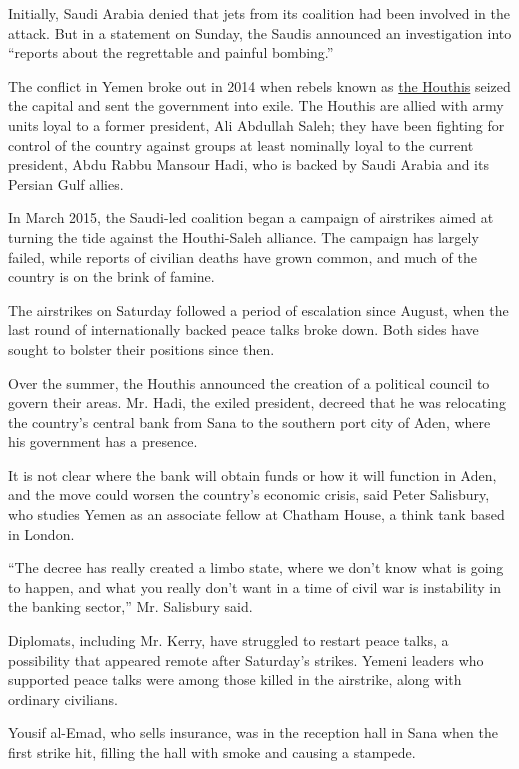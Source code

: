 Initially, Saudi Arabia denied that jets from its coalition had been
involved in the attack. But in a statement on Sunday, the Saudis
announced an investigation into ``reports about the regrettable and
painful bombing.''

The conflict in Yemen broke out in 2014 when rebels known as
\href{http://www.nytimes3xbfgragh.onion/2015/01/21/world/middleeast/who-are-the-houthis-of-yemen.html}{the
Houthis} seized the capital and sent the government into exile. The
Houthis are allied with army units loyal to a former president, Ali
Abdullah Saleh; they have been fighting for control of the country
against groups at least nominally loyal to the current president, Abdu
Rabbu Mansour Hadi, who is backed by Saudi Arabia and its Persian Gulf
allies.

In March 2015, the Saudi-led coalition began a campaign of airstrikes
aimed at turning the tide against the Houthi-Saleh alliance. The
campaign has largely failed, while reports of civilian deaths have grown
common, and much of the country is on the brink of famine.

The airstrikes on Saturday followed a period of escalation since August,
when the last round of internationally backed peace talks broke down.
Both sides have sought to bolster their positions since then.

Over the summer, the Houthis announced the creation of a political
council to govern their areas. Mr. Hadi, the exiled president, decreed
that he was relocating the country's central bank from Sana to the
southern port city of Aden, where his government has a presence.

It is not clear where the bank will obtain funds or how it will function
in Aden, and the move could worsen the country's economic crisis, said
Peter Salisbury, who studies Yemen as an associate fellow at Chatham
House, a think tank based in London.

``The decree has really created a limbo state, where we don't know what
is going to happen, and what you really don't want in a time of civil
war is instability in the banking sector,'' Mr. Salisbury said.

Diplomats, including Mr. Kerry, have struggled to restart peace talks, a
possibility that appeared remote after Saturday's strikes. Yemeni
leaders who supported peace talks were among those killed in the
airstrike, along with ordinary civilians.

Yousif al-Emad, who sells insurance, was in the reception hall in Sana
when the first strike hit, filling the hall with smoke and causing a
stampede.

